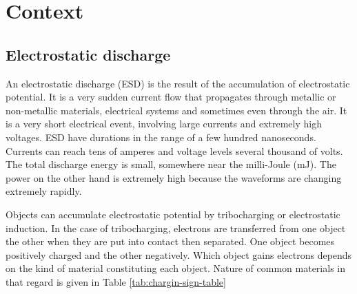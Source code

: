 \section{Context}
\subsection{Electrostatic discharge}

An electrostatic discharge (ESD) is the result of the accumulation of electrostatic potential.
It is a very sudden current flow that propagates through metallic or non-metallic materials, electrical systems and sometimes even through the air.
It is a very short electrical event, involving large currents and extremely high voltages.
\gls{ESD} have durations in the range of a few hundred nanoseconds.
Currents can reach tens of amperes and voltage levels several thousand of volts.
The total discharge energy is small, somewhere near the milli-Joule (mJ).
The power on the other hand is extremely high because the waveforms are changing extremely rapidly.

Objects can accumulate electrostatic potential by tribocharging or electrostatic induction.
In the case of tribocharging, electrons are transferred from one object the other when they are put into contact then separated.
One object becomes positively charged and the other negatively.
Which object gains electrons depends on the kind of material constituting each object.
Nature of common materials in that regard is given in Table \ref{tab:chargin-sign-table}


